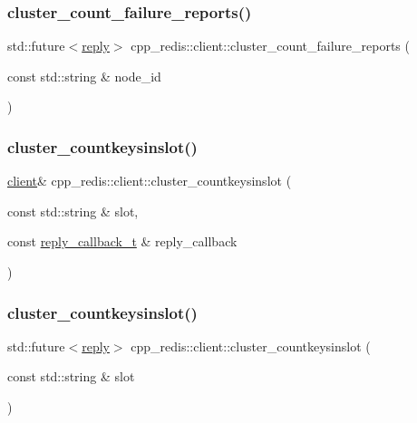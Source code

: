 \subsubsection{\texorpdfstring{cluster\+\_\+count\+\_\+failure\+\_\+reports()}{cluster\_count\_failure\_reports()}\hspace{0.1cm}{\footnotesize\ttfamily [2/2]}}
{\footnotesize\ttfamily std\+::future$<$\hyperlink{classcpp__redis_1_1reply}{reply}$>$ cpp\+\_\+redis\+::client\+::cluster\+\_\+count\+\_\+failure\+\_\+reports (\begin{DoxyParamCaption}\item[{const std\+::string \&}]{node\+\_\+id }\end{DoxyParamCaption})}

\mbox{\label{classcpp__redis_1_1client_a78017860625d016074d0495c24c3f9e8}} 
\subsubsection{\texorpdfstring{cluster\+\_\+countkeysinslot()}{cluster\_countkeysinslot()}\hspace{0.1cm}{\footnotesize\ttfamily [1/2]}}
{\footnotesize\ttfamily \hyperlink{classcpp__redis_1_1client}{client}\& cpp\+\_\+redis\+::client\+::cluster\+\_\+countkeysinslot (\begin{DoxyParamCaption}\item[{const std\+::string \&}]{slot,  }\item[{const \hyperlink{classcpp__redis_1_1client_a061a1140d36d2eaeda82b09a0bb3f9f2}{reply\+\_\+callback\+\_\+t} \&}]{reply\+\_\+callback }\end{DoxyParamCaption})}

\mbox{\label{classcpp__redis_1_1client_a8135eee3cfc95b061aee9b6f7271efce}} 
\subsubsection{\texorpdfstring{cluster\+\_\+countkeysinslot()}{cluster\_countkeysinslot()}\hspace{0.1cm}{\footnotesize\ttfamily [2/2]}}
{\footnotesize\ttfamily std\+::future$<$\hyperlink{classcpp__redis_1_1reply}{reply}$>$ cpp\+\_\+redis\+::client\+::cluster\+\_\+countkeysinslot (\begin{DoxyParamCaption}\item[{const std\+::string \&}]{slot }\end{DoxyParamCaption})}

